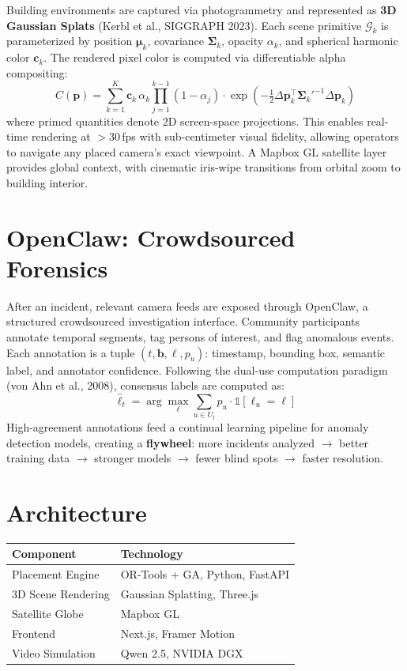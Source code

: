 \documentclass[9pt,letterpaper,twocolumn]{extarticle}
\begin{document}
Building environments are captured via photogrammetry and represented as \textbf{3D Gaussian Splats} (Kerbl et al., SIGGRAPH 2023). Each scene primitive $\mathcal{G}_k$ is parameterized by position $\boldsymbol{\mu}_k$, covariance $\boldsymbol{\Sigma}_k$, opacity $\alpha_k$, and spherical harmonic color $\mathbf{c}_k$. The rendered pixel color is computed via differentiable alpha compositing:
%
\begin{equation}
C(\mathbf{p}) = \sum_{k=1}^{K} \mathbf{c}_k \, \alpha_k \prod_{j=1}^{k-1}(1 - \alpha_j) \cdot \exp\!\left(-\tfrac{1}{2}\Delta\mathbf{p}_k^\top \boldsymbol{\Sigma}_k'^{-1} \Delta\mathbf{p}_k\right)
\end{equation}
%
where primed quantities denote 2D screen-space projections. This enables real-time rendering at ${>}30$\,fps with sub-centimeter visual fidelity, allowing operators to navigate any placed camera's exact viewpoint. A Mapbox GL satellite layer provides global context, with cinematic iris-wipe transitions from orbital zoom to building interior.

\section*{OpenClaw: Crowdsourced Forensics}

After an incident, relevant camera feeds are exposed through OpenClaw, a structured crowdsourced investigation interface. Community participants annotate temporal segments, tag persons of interest, and flag anomalous events. Each annotation is a tuple $(t, \mathbf{b}, \ell, p_u)$: timestamp, bounding box, semantic label, and annotator confidence. Following the dual-use computation paradigm (von Ahn et al., 2008), consensus labels are computed as:
%
\begin{equation}
\hat{\ell}_t = \arg\max_{\ell} \sum_{u \in U_t} p_u \cdot \mathbb{1}[\ell_u = \ell]
\end{equation}
%
High-agreement annotations feed a continual learning pipeline for anomaly detection models, creating a \textbf{flywheel}: more incidents analyzed $\to$ better training data $\to$ stronger models $\to$ fewer blind spots $\to$ faster resolution.

\section*{Architecture}

\vspace{2pt}
{\small
\begin{tabular}{@{}ll@{}}
\toprule
\textbf{Component} & \textbf{Technology} \\
\midrule
Placement Engine & OR-Tools + GA, Python, FastAPI \\
3D Scene Rendering & Gaussian Splatting, Three.js \\
Satellite Globe & Mapbox GL \\
Frontend & Next.js, Framer Motion \\
Video Simulation & Qwen 2.5, NVIDIA DGX \\
\bottomrule
\end{tabular}}
\end{document}
